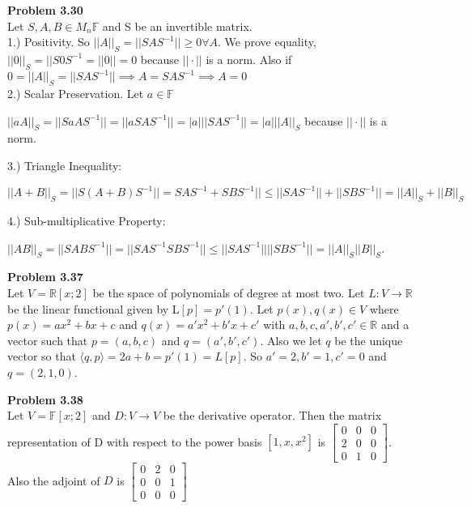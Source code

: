 \documentclass[letterpaper,12pt]{article}
\theoremstyle{definition}
\begin{document}
 \noindent\textbf{Problem 3.30}\\
 Let $S, A, B \in M_n\mathbb F$ and S be an invertible matrix.\\
 1.) Positivity.    So $||A||_S = ||SAS^{-1}|| \geq 0 \forall A$.  We prove equality, $||0||_S = ||S0S^{-1} = ||0|| = 0$ because $||\cdot||$ is a norm.  Also if $0 = ||A||_S = ||SAS^{-1}|| \implies A = SAS^{-1} \implies A = 0$\\
 2.) Scalar Preservation.  Let $a \in \mathbb{F}$
 \begin{center}
 $||aA||_S = ||SaAS^{-1}|| = ||aSAS^{-1}|| = |a|||SAS^{-1}|| = |a|||A||_S$ because $||\cdot||$ is a norm. \end{center}
 3.) Triangle Inequality: \begin{center} 
 $||A + B||_S = ||S(A + B)S^{-1}|| = SAS^{-1} + SBS^{-1}|| \leq ||SAS^{-1}|| + ||SBS^{-1}|| = ||A||_S + ||B||_S$\end{center}
 4.) Sub-multiplicative Property: \begin{center}
 $||AB||_S = ||SABS^{-1}|| = ||SAS^{-1}SBS^{-1}|| \leq ||SAS^{-1}||||SBS^{-1}|| = ||A||_S||B||_S$.\end{center}
 
 \vspace{5mm}
 
\noindent\textbf{Problem 3.37}\\
Let $ V = \mathbb{R}[x; 2]$ be the space of polynomials of degree at most two.  Let $L : V \rightarrow \mathbb{R}$ be the linear functional given by L$[p] = p'(1)$.  Let $p(x), q(x) \in V$ where $p(x) = ax^2 + bx + c$  and $q(x) = a'x^2 + b'x + c'$ with $a,b,c,a',b',c' \in \mathbb{R}$ and a vector such that $p = (a, b, c)$ and $q = (a', b', c')$. Also we let $q$ be the unique vector so that $\langle q, p \rangle = 2a + b = p'(1) = L[p] $.  So $a'= 2, b'=1, c'=0$ and $q = (2, 1, 0)$.\\

 \vspace{5mm}
 
\noindent\textbf{Problem 3.38}\\
Let $ V = \mathbb{F}[x; 2]$ and $D: V \rightarrow V$ be the derivative operator.  Then the matrix representation of D with respect to the power basis $[1, x, x^2]$ is $\begin{bmatrix} 0 & 0 & 0 \\ 2 & 0 & 0 \\ 0 & 1 & 0 \end{bmatrix}$.  Also the adjoint of $D$ is $\begin{bmatrix} 0 & 2 & 0 \\ 0 & 0 & 1 \\ 0 & 0 & 0 \end{bmatrix}$
\end{document}
